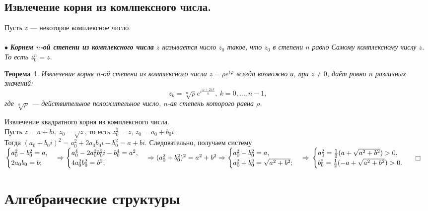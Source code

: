 \documentclass[a4paper, 12pt]{report}
\newenvironment{examp} %
{\par\noindent{\textbf{\textsc{Пример:}}}} %
{\hfill$\scriptstyle\Box$}
\begin{document}
\section{Извлечение корня из комлпексного числа.}
Пусть $z$ --- некоторое комплексное число.\\\\
$\bullet$ \textit{\textbf{Корнем $n$-ой степени из комплексного числа} $z$ называется число $z_0$ такое, что $z_0$ в степени $n$ равно Самому комплексному числу $z$. То есть $z_0^n = z$.}
\newtheorem*{t6_3_1}{Теорема}\begin{t6_3_1} Извлечение корня $n$-ой степени из комплексного числа $z = \rho e^{i\varphi}$ всегда возможно и, при $z\ne 0$, даёт
	ровно $n$ различных значений: $$z_k = \sqrt[n]{\rho}e^{i\frac{\varphi + 2\pi k}{n}},\ k=0,\dots,n-1,$$
	где $\sqrt[n]{\rho}$ --- действительное положительное число, $n$-ая степень которого равна $\rho$.
\end{t6_3_1}
\begin{examp}
	Извлечение квадратного корня из комплексного числа. \\Пусть $z = a + bi$, $z_0 = \sqrt{z}$, то есть $z_0^2 = z$, $z_0 = a_0 + b_0i$. \\Тогда $(a_0 + b_0i)^2 = a_0^2 + 2 a_0 b_0 i - b_0^2 = a + bi$. Следовательно, получаем систему$\begin{cases}
		a_0^2 - b_0^2 = a,\\
		2a_0b_0 = b;
	\end{cases}\Rightarrow\begin{cases}
		a_0^4 - 2 a_0^2 b_0^2 i - b_0^4 = a^2,\\
		4a_0^2b_0^2 = b^2;
	\end{cases}\Rightarrow (a_0^2 + b_0^2)^2 = a^2 + b^2\Rightarrow\begin{cases}
		a_0^2 - b_0^2 = a,\\
		a_0^2 + b_0^2 = \sqrt{a^2 + b^2};
	\end{cases}\Rightarrow\\\begin{cases}a_0^2 = \frac{1}{2}(a + \sqrt{a^2 + b^2}) > 0,\\
		b_0^2 = \frac{1}{2}(-a + \sqrt{a^2 + b^2}) > 0.
	\end{cases}$
\end{examp} 
	
	
	
	
	
	\chapter{Алгебраические структуры}
\end{document}
